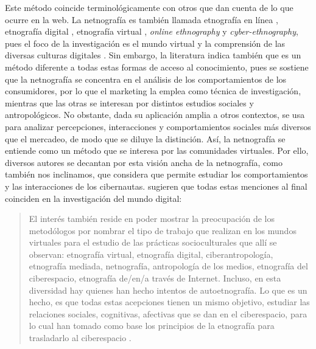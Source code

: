 Este método coincide terminológicamente con otros que dan cuenta de lo
que ocurre en la web. La netnografía es también llamada etnografía en
línea \cite{markham2005methods}, etnografía digital \cite{murthy2008}, etnografía
virtual \cite{hine2000virtual}, \emph{online ethnography} y
\emph{cyber-ethnography}, pues el foco de la investigación es el mundo
virtual \cite{chanona2018}y la comprensión de las diversas
culturas digitales \cite{dominguiez2007}. Sin embargo, la literatura indica
también que es un método diferente a todas estas formas de acceso al
conocimiento, pues se sostiene que la netnografía se concentra en el
análisis de los comportamientos de los consumidores, por lo que el
marketing la emplea como técnica de investigación, mientras que las
otras se interesan por distintos estudios sociales y antropológicos. No
obstante, dada su aplicación amplia a otros contextos, se usa para
analizar percepciones, interacciones y comportamientos sociales más
diversos que el mercadeo, de modo que se diluye la distinción. Así, la
netnografía se entiende como un método que se interesa por las
comunidades virtuales. Por ello, diversos autores se decantan por esta
visión ancha de la netnografía, como también nos inclinamos, que
considera que permite estudiar los comportamientos y las interacciones
de los cibernautas. \textcite{ruiz2015etnografia} sugieren que todas estas
menciones al final coinciden en la investigación del mundo digital:

\begin{quote}
El interés también reside en poder mostrar la preocupación de los
metodólogos por nombrar el tipo de trabajo que realizan en los mundos
virtuales para el estudio de las prácticas socioculturales que allí se
observan: etnografía virtual, etnografía digital, ciberantropología,
etnografía mediada, netnografía, antropología de los medios, etnografía
del ciberespacio, etnografía de/en/a través de Internet. Incluso, en
esta diversidad hay quienes han hecho intentos de autoetnografía. Lo que
es un hecho, es que todas estas acepciones tienen un mismo objetivo,
estudiar las relaciones sociales, cognitivas, afectivas que se dan en el
ciberespacio, para lo cual han tomado como base los principios de la
etnografía para trasladarlo al ciberespacio \citeyear[p. 70]{ruiz2015etnografia}.
\end{quote}

